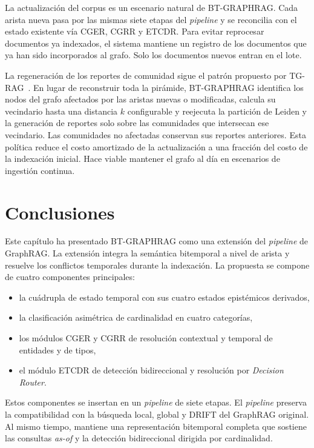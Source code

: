 La actualización del corpus es un escenario natural de BT-GRAPHRAG. Cada arista nueva pasa por las mismas siete etapas del \emph{pipeline} y se reconcilia con el estado existente vía CGER, CGRR y ETCDR. Para evitar reprocesar documentos ya indexados, el sistema mantiene un registro de los documentos que ya han sido incorporados al grafo. Solo los documentos nuevos entran en el lote.

La regeneración de los reportes de comunidad sigue el patrón propuesto por TG-RAG~\cite{tg_rag2025}. En lugar de reconstruir toda la pirámide, BT-GRAPHRAG identifica los nodos del grafo afectados por las aristas nuevas o modificadas, calcula su vecindario hasta una distancia $k$ configurable y reejecuta la partición de Leiden y la generación de reportes solo sobre las comunidades que intersecan ese vecindario. Las comunidades no afectadas conservan sus reportes anteriores. Esta política reduce el costo amortizado de la actualización a una fracción del costo de la indexación inicial. Hace viable mantener el grafo al día en escenarios de ingestión continua.

\section{Conclusiones}\label{sec:bt-conclusions}

Este capítulo ha presentado BT-GRAPHRAG como una extensión del \emph{pipeline} de GraphRAG. La extensión integra la semántica bitemporal a nivel de arista y resuelve los conflictos temporales durante la indexación. La propuesta se compone de cuatro componentes principales:

\begin{itemize}
    \item la cuádrupla de estado temporal con sus cuatro estados epistémicos derivados,
    \item la clasificación asimétrica de cardinalidad en cuatro categorías,
    \item los módulos CGER y CGRR de resolución contextual y temporal de entidades y de tipos,
    \item el módulo ETCDR de detección bidireccional y resolución por \emph{Decision Router}.
\end{itemize}

Estos componentes se insertan en un \emph{pipeline} de siete etapas. El \emph{pipeline} preserva la compatibilidad con la búsqueda local, global y DRIFT del GraphRAG original. Al mismo tiempo, mantiene una representación bitemporal completa que sostiene las consultas \emph{as-of} y la detección bidireccional dirigida por cardinalidad.

